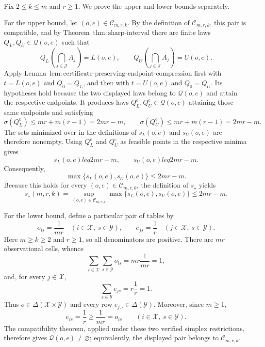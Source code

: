 Fix \(2\leq k\leq m\) and \(r\geq1\).  We prove the upper and lower bounds separately.

For the upper bound, let \((o,e)\in\mathcal C_{m,r,k}\).  By the definition of \(\mathcal C_{m,r,k}\), this pair is compatible, and by Theorem~\(\mathrm{thm{:}sharp\mbox{-}interval}\) there are finite laws \(Q_L,Q_U\in\mathcal Q(o,e)\) such that
\[
 Q_L\!\left(\bigcap_{j\in\mathcal J}A_j\right)=L(o,e),
 \qquad
 Q_U\!\left(\bigcap_{j\in\mathcal J}A_j\right)=U(o,e).
\]
Apply Lemma~\(\mathrm{lem{:}certificate\mbox{-}preserving\mbox{-}endpoint\mbox{-}compression}\) first with \(t=L(o,e)\) and \(Q_0=Q_L\), and then with \(t=U(o,e)\) and \(Q_0=Q_U\).  Its hypotheses hold because the two displayed laws belong to \(\mathcal Q(o,e)\) and attain the respective endpoints.  It produces laws \(Q_L^{\mathrm c},Q_U^{\mathrm c}\in\mathcal Q(o,e)\) attaining those same endpoints and satisfying
\[
 \sigma(Q_L^{\mathrm c})\leq mr+m(r-1)=2mr-m,
 \qquad
 \sigma(Q_U^{\mathrm c})\leq mr+m(r-1)=2mr-m.
\]
The sets minimized over in the definitions of \(s_L(o,e)\) and \(s_U(o,e)\) are therefore nonempty.  Using \(Q_L^{\mathrm c}\) and \(Q_U^{\mathrm c}\) as feasible points in the respective minima gives
\[
 s_L(o,e)leq2mr-m,
 \qquad
 s_U(o,e)leq2mr-m.
\]
Consequently,
\[
 \max\{s_L(o,e),s_U(o,e)\}\leq2mr-m.
\]
Because this holds for every \((o,e)\in\mathcal C_{m,r,k}\), the definition of \(s_\star\) yields
\[
 s_\star(m,r,k)
 =\sup_{(o,e)\in\mathcal C_{m,r,k}}
   \max\{s_L(o,e),s_U(o,e)\}
 \leq2mr-m.
\]

For the lower bound, define a particular pair of tables by
\[
 o_{is}=\frac{1}{mr}
 \quad(i\in\mathcal X,\ s\in\mathcal Y),
 \qquad
 e_{js}=\frac{1}{r}
 \quad(j\in\mathcal X,\ s\in\mathcal Y).
\]
Here \(m\geq k\geq2\) and \(r\geq1\), so all denominators are positive.  There are \(mr\) observational cells, whence
\[
 \sum_{i\in\mathcal X}\sum_{s\in\mathcal Y}o_{is}
 =mr\frac{1}{mr}=1,
\]
and, for every \(j\in\mathcal X\),
\[
 \sum_{s\in\mathcal Y}e_{js}=r\frac{1}{r}=1.
\]
Thus \(o\in\Delta(\mathcal X\times\mathcal Y)\) and every row \(e_{j,\cdot}\in\Delta(\mathcal Y)\).  Moreover, since \(m\geq1\),
\[
 e_{is}=\frac1r\geq\frac1{mr}=o_{is}
 \qquad(i\in\mathcal X,\ s\in\mathcal Y).
\]
The compatibility theorem, applied under these two verified simplex restrictions, therefore gives \(\mathcal Q(o,e)\neq\varnothing\); equivalently, the displayed pair belongs to \(\mathcal C_{m,r,k}\).

